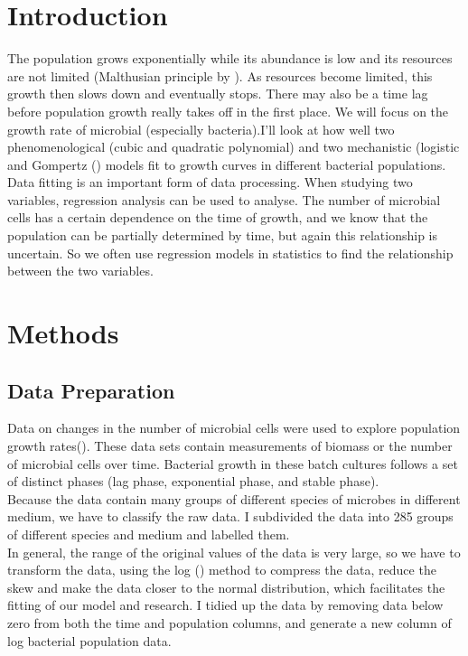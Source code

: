 \documentclass[11pt]{article}
\begin{document}
\section{Introduction}
The population grows exponentially while its abundance is low and its resources are not limited (Malthusian principle by \cite{malthus_1989}). As resources become limited, this growth then slows down and eventually stops. There may also be a time lag before population growth really takes off in the first place. We will focus on the growth rate of microbial (especially bacteria).I'll look at how well two phenomenological (cubic and quadratic polynomial) and two mechanistic (logistic and Gompertz (\cite{gompertz1825xxiv}) models fit to growth curves in different bacterial populations.\\
Data fitting is an important form of data processing. When studying two variables, regression analysis can be used to analyse. The number of microbial cells has a certain dependence on the time of growth, and we know that the population can be partially determined by time, but again this relationship is uncertain. So we often use regression models in statistics to find the relationship between the two variables.\\
\newpage
\section{Methods}
\subsection{Data Preparation}
Data on changes in the number of microbial cells were used to explore population growth rates(\cite{roth1962continuity, stannard1985temperature, phillips1987relation, sivonen1990effects, gill1991growth, zwietering1994modeling, bae2014growth, galarz2016predicting, bernhardt2018metabolic, silva2018modelling}). 
These data sets contain measurements of biomass or the number of microbial cells over time. Bacterial growth in these batch cultures follows a set of distinct phases (lag phase, exponential phase, and stable phase).\\
Because the data contain many groups of different species of microbes in different medium, we have to classify the raw data. 
I subdivided the data into 285 groups of different species and medium and labelled them.\\
In general, the range of the original values of the data is very large, so we have to transform the data, using the log () method to compress the data, reduce the skew and make the data closer to the normal distribution, which facilitates the fitting of our model and research.
I tidied up the data by removing data below zero from both the time and population columns, and generate a new column of log bacterial population data.\\
\end{document}
